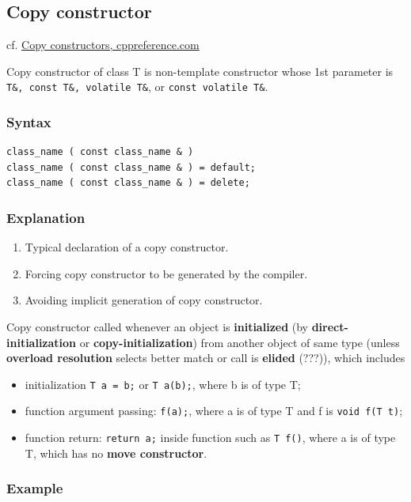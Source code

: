 \documentclass[10pt]{amsart}
\begin{document}
\begin{multicols*}{2}
\subsection{Copy constructor}

cf. \href{http://en.cppreference.com/w/cpp/language/copy_constructor}{Copy constructors, cppreference.com}

Copy constructor of class T is non-template constructor whose 1st parameter is \verb|T&, const T&, volatile T&|, or \verb|const volatile T&|.  

\subsubsection{Syntax}  

\begin{lstlisting}
class_name ( const class_name & )  
class_name ( const class_name & ) = default;  
class_name ( const class_name & ) = delete;
\end{lstlisting}  

\subsubsection{Explanation}  
\begin{enumerate}
\item Typical declaration of a copy constructor.  
\item Forcing copy constructor to be generated by the compiler.  
\item Avoiding implicit generation of copy constructor.  
\end{enumerate}


Copy constructor called whenever an object is \textbf{initialized} (by \textbf{direct-initialization} or \textbf{copy-initialization}) from another object of same type (unless \textbf{overload resolution} selects better match or call is \textbf{elided} (???)), which includes  
\begin{itemize}
\item initialization \verb|T a = b;| or \verb|T a(b);|, where b is of type T;  
\item function argument passing: \verb|f(a);|, where a is of type T and f is \verb|void f(T t)|;  
\item function return: \verb|return a;| inside function such as \verb|T f()|, where a is of type T, which has no \textbf{move constructor}.   
\end{itemize}

\subsubsection{Example}  


\end{multicols*}
\end{document}
